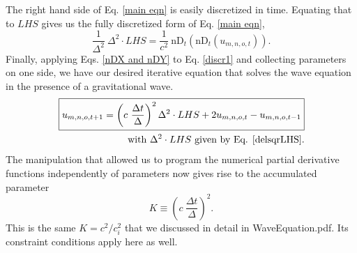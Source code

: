 \documentclass{article}
\begin{document}
The right hand side of Eq. \ref{main eqn} is easily discretized in time. Equating that to $LHS$ gives us the fully discretized form of Eq. \ref{main eqn},
\begin{equation} \label{discr1}
\frac{1}{\Delta^2}\ \Delta^2 \cdot LHS = \frac{1}{c^2}\ \mbox{nD}_t(\mbox{nD}_t(u_{m,n,o,t})).
\end{equation}
Finally, applying Eqs. \ref{nDX and nDY} to Eq. \ref{discr1} and collecting parameters on one side, we have our desired iterative equation that solves the wave equation in the presence of a gravitational wave.
\begin{align} \label{discr main eqn}
\boxed{
u_{m,n,o,t+1}=\left(c\ \frac{\Delta t}{\Delta}\right)^2 \Delta^2 \cdot LHS+2u_{m,n,o,t}-u_{m,n,o,t-1}
} \\
\text{with $\Delta^2 \cdot LHS$ given by Eq. \ref{delsqrLHS}.} \nonumber
\end{align}
The manipulation that allowed us to program the numerical partial derivative functions independently of parameters now gives rise to the accumulated parameter
\begin{equation} \label{K}
K\equiv\left(c\ \frac{\Delta t}{\Delta}\right)^2.
\end{equation}
This is the same $K=c^2/c_i^2$ that we discussed in detail in WaveEquation.pdf. Its constraint conditions apply here as well.
\end{document}

